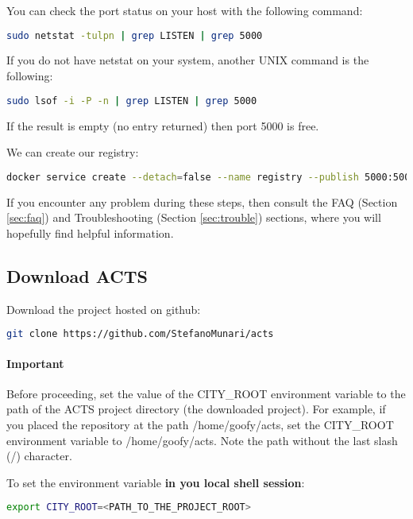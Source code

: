 You can check the port status on your host with the following command:

\begin{lstlisting}[language=bash]
sudo netstat -tulpn | grep LISTEN | grep 5000
\end{lstlisting}

If you do not have netstat on your system, another UNIX command is the
following:

\begin{lstlisting}[language=bash]
sudo lsof -i -P -n | grep LISTEN | grep 5000
\end{lstlisting}

If the result is empty (no entry returned) then port 5000 is free.

We can create our registry:

\begin{lstlisting}[language=bash]
docker service create --detach=false --name registry --publish 5000:5000 registry:latest
\end{lstlisting}

If you encounter any problem during these steps, then
consult the FAQ (Section \ref{sec:faq}) and
Troubleshooting (Section \ref{sec:trouble})
sections, where you will hopefully find
helpful information.


\subsection{Download ACTS}

Download the project hosted on github:

\begin{lstlisting}[language=bash]
git clone https://github.com/StefanoMunari/acts
\end{lstlisting}

\paragraph{Important}
Before proceeding, set the value
of the CITY\_ROOT environment variable to the path of the ACTS project
directory (the downloaded project).
For example, if you placed the repository at the path
/home/goofy/acts, set the CITY\_ROOT environment variable to
/home/goofy/acts. Note the path without the last slash (/)
character.

To set the environment variable \textbf{in you local shell session}:
\begin{lstlisting}[language=bash]
export CITY_ROOT=<PATH_TO_THE_PROJECT_ROOT>
\end{lstlisting}

